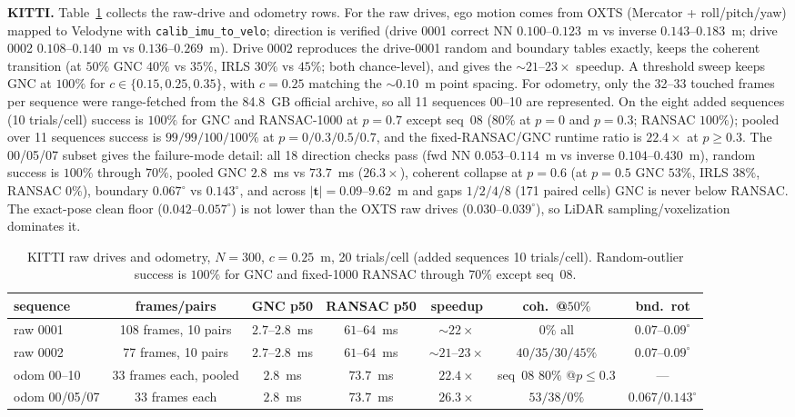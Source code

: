 \noindent\textbf{KITTI.} Table~\ref{tab:kitti} collects the raw-drive and odometry rows. For the raw
drives, ego motion comes from OXTS (Mercator + roll/pitch/yaw) mapped to Velodyne with
\texttt{calib\_imu\_to\_velo}; direction is verified (drive 0001 correct NN $0.100$--$0.123$~m vs
inverse $0.143$--$0.183$~m; drive 0002 $0.108$--$0.140$~m vs $0.136$--$0.269$~m). Drive 0002
reproduces the drive-0001 random and boundary tables exactly, keeps the coherent transition (at
$50\%$ GNC $40\%$ vs $35\%$, IRLS $30\%$ vs $45\%$; both chance-level), and gives the
$\sim21$--$23\times$ speedup. A threshold sweep keeps GNC at $100\%$ for
$c\in\{0.15,0.25,0.35\}$, with $c=0.25$ matching the $\sim0.10$~m point spacing. For odometry, only
the 32--33 touched frames per sequence were range-fetched from the 84.8~GB official archive, so all
11 sequences 00--10 are represented. On the eight added sequences (10 trials/cell) success is
$100\%$ for GNC and RANSAC-1000 at $p=0.7$ except seq~08 ($80\%$ at $p=0$ and $p=0.3$; RANSAC
$100\%$); pooled over 11 sequences success is $99/99/100/100\%$ at $p=0/0.3/0.5/0.7$, and the
fixed-RANSAC/GNC runtime ratio is $22.4\times$ at $p\ge0.3$. The 00/05/07 subset gives the
failure-mode detail: all 18 direction checks pass (fwd NN $0.053$--$0.114$~m vs inverse
$0.104$--$0.430$~m), random success is $100\%$ through $70\%$, pooled GNC $2.8$~ms vs $73.7$~ms
($26.3\times$), coherent collapse at $p=0.6$ (at $p=0.5$ GNC $53\%$, IRLS $38\%$, RANSAC $0\%$),
boundary $0.067^\circ$ vs $0.143^\circ$, and across $|\mathbf{t}|=0.09$--$9.62$~m and gaps
$1/2/4/8$ (171 paired cells) GNC is never below RANSAC. The exact-pose clean floor
($0.042$--$0.057^\circ$) is not lower than the OXTS raw drives ($0.030$--$0.039^\circ$), so LiDAR
sampling/voxelization dominates it.

\begin{table}[t]
\caption{KITTI raw drives and odometry, $N=300$, $c=0.25$~m, 20 trials/cell (added sequences 10
trials/cell). Random-outlier success is $100\%$ for GNC and fixed-1000 RANSAC through $70\%$ except
seq~08.}
\label{tab:kitti}
\centering
\footnotesize
\setlength{\tabcolsep}{3pt}
\begin{tabular}{lcccccc}
\toprule
sequence & frames/pairs & GNC p50 & RANSAC p50 & speedup & coh.\ @$50\%$ & bnd.\ rot \\
\midrule
raw 0001 & 108 frames, 10 pairs & $2.7$--$2.8$~ms & $61$--$64$~ms & $\sim22\times$ & $0\%$ all & $0.07$--$0.09^\circ$ \\
raw 0002 & 77 frames, 10 pairs & $2.7$--$2.8$~ms & $61$--$64$~ms & $\sim21$--$23\times$ & $40/35/30/45\%$ & $0.07$--$0.09^\circ$ \\
odom 00--10 & 33 frames each, pooled & $2.8$~ms & $73.7$~ms & $22.4\times$ & seq~08 $80\%$ @$p\le0.3$ & --- \\
odom 00/05/07 & 33 frames each & $2.8$~ms & $73.7$~ms & $26.3\times$ & $53/38/0\%$ & $0.067/0.143^\circ$ \\
\bottomrule
\end{tabular}
\end{table}

